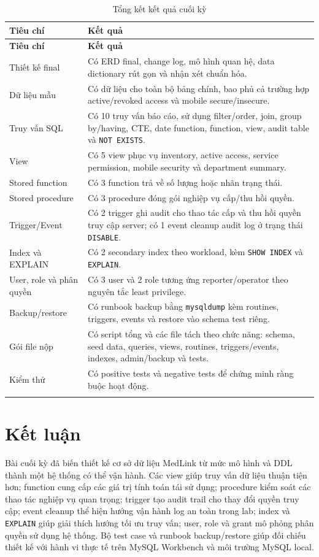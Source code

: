 \documentclass[12pt, a4paper, oneside, openany]{report}
\begin{document}
\begin{longtable}{|L{4.2cm}|L{9.3cm}|}
\hline
\textbf{Tiêu chí} & \textbf{Kết quả} \\
\hline
\endfirsthead
\hline
\textbf{Tiêu chí} & \textbf{Kết quả} \\
\hline
\endhead
Thiết kế final & Có ERD final, change log, mô hình quan hệ, data dictionary rút gọn và nhận xét chuẩn hóa. \\
\hline
Dữ liệu mẫu & Có dữ liệu cho toàn bộ bảng chính, bao phủ cả trường hợp active/revoked access và mobile secure/insecure. \\
\hline
Truy vấn SQL & Có 10 truy vấn báo cáo, sử dụng filter/order, join, group by/having, CTE, date function, function, view, audit table và \texttt{NOT EXISTS}. \\
\hline
View & Có 5 view phục vụ inventory, active access, service permission, mobile security và department summary. \\
\hline
Stored function & Có 3 function trả về số lượng hoặc nhãn trạng thái. \\
\hline
Stored procedure & Có 3 procedure đóng gói nghiệp vụ cấp/thu hồi quyền. \\
\hline
Trigger/Event & Có 2 trigger ghi audit cho thao tác cấp và thu hồi quyền truy cập server; có 1 event cleanup audit log ở trạng thái \texttt{DISABLE}. \\
\hline
Index và EXPLAIN & Có 2 secondary index theo workload, kèm \texttt{SHOW INDEX} và \texttt{EXPLAIN}. \\
\hline
User, role và phân quyền & Có 3 user và 2 role tương ứng reporter/operator theo nguyên tắc least privilege. \\
\hline
Backup/restore & Có runbook backup bằng \texttt{mysqldump} kèm routines, triggers, events và restore vào schema test riêng. \\
\hline
Gói file nộp & Có script tổng và các file tách theo chức năng: schema, seed data, queries, views, routines, triggers/events, indexes, admin/backup và tests. \\
\hline
Kiểm thử & Có positive tests và negative tests để chứng minh ràng buộc hoạt động. \\
\hline
\caption{Tổng kết kết quả cuối kỳ}
\end{longtable}

\section{Kết luận}

Bài cuối kỳ đã biến thiết kế cơ sở dữ liệu MedLink từ mức mô hình và DDL thành một hệ thống có thể vận hành. Các view giúp truy vấn dữ liệu thuận tiện hơn; function cung cấp các giá trị tính toán tái sử dụng; procedure kiểm soát các thao tác nghiệp vụ quan trọng; trigger tạo audit trail cho thay đổi quyền truy cập; event cleanup thể hiện hướng vận hành log an toàn trong lab; index và \texttt{EXPLAIN} giúp giải thích hướng tối ưu truy vấn; user, role và grant mô phỏng phân quyền sử dụng hệ thống. Bộ test case và runbook backup/restore giúp đối chiếu thiết kế với hành vi thực tế trên MySQL Workbench và môi trường MySQL local.
\end{document}
